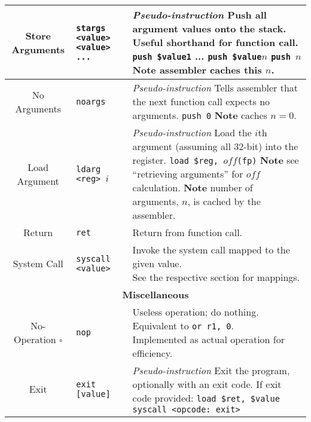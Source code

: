 \documentclass{article}
\begin{document}
\begin{longtable}{|c|l|l|}
    \hline
    Store Arguments & \texttt{stargs <value> <value> ...} & \makecell[l]{\textit{Pseudo-instruction}\\%
    Push all argument values onto the stack.\\%
    Useful shorthand for function call.\\%
    \texttt{push \$value1}\\%
    ...\\%
    \texttt{push \$value\(n\)}\\%
    \texttt{push \(n\)}\\%
    \textbf{Note} assembler caches this \(n\).} \\
    \hline
    No Arguments & \texttt{noargs} & \makecell[l]{\textit{Pseudo-instruction}\\%
    Tells assembler that the next function call expects no arguments.\\%
    \texttt{push 0}\\%
    \textbf{Note} caches \(n = 0\).} \\
    \hline
    Load Argument & \texttt{ldarg <reg> \(i\)} & \makecell[l]{\textit{Pseudo-instruction}\\%
    Load the \(i\)th argument (assuming all 32-bit) into the register.\\%
    \texttt{load \$reg, \(off\)(fp)}\\%
    \textbf{Note} see ``retrieving arguments'' for \(off\) calculation.\\%
    \textbf{Note} number of arguments, \(n\), is cached by the assembler.} \\
    \hline
    Return & \texttt{ret} & Return from function call. \\
    \hline
    System Call & \texttt{syscall <value>} & \makecell[l]{Invoke the system call mapped to the given value.\\%
    See the respective section for mappings.} \\
    \hline \hline
    \multicolumn{3}{|c|}{\textbf{Miscellaneous}} \\
    \hline
    No-Operation \(\square\) & \texttt{nop} & \makecell[l]{Useless operation; do nothing.\\%
    Equivalent to \texttt{or r1, 0}.\\%
    Implemented as actual operation for efficiency.} \\
    \hline
    Exit & \texttt{exit [value]} & \makecell[l]{\textit{Pseudo-instruction}\\%
    Exit the program, optionally with an exit code.\\%
    If exit code provided: \texttt{load \$ret, \$value}\\%
    \texttt{syscall <opcode: exit>}} \\
    \hline
\end{longtable}
\end{document}
